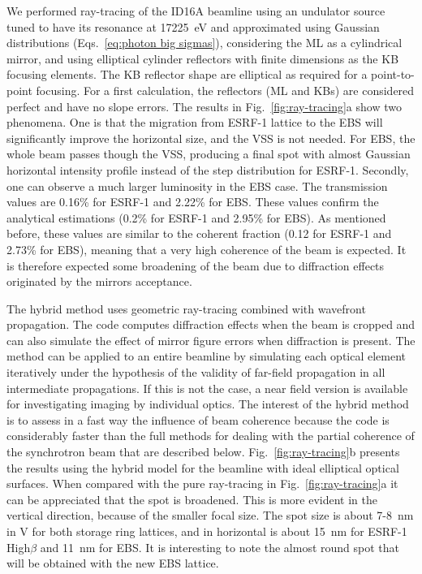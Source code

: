 \documentclass{iucr}              %
\begin{document}
We performed ray-tracing of the ID16A beamline using an undulator source tuned to have its resonance at 17225~eV and approximated using Gaussian distributions (Eqs.~\ref{eq:photon big sigmas}), considering the ML as a cylindrical mirror, and using elliptical cylinder reflectors with finite dimensions as the KB focusing elements. The KB reflector shape are elliptical as required for a point-to-point focusing. For a first calculation, the reflectors (ML and KBs) are considered perfect and have no slope errors. 
The results in Fig.~\ref{fig:ray-tracing}a show two phenomena. One is that the migration from ESRF-1 lattice to the EBS will significantly improve the horizontal size, and the VSS is not needed. For EBS, the whole beam passes though the VSS, producing a final spot with almost Gaussian horizontal intensity profile instead of the step distribution for ESRF-1. Secondly, one can observe a much larger luminosity in the EBS case. The transmission values are 0.16\% for ESRF-1 and 2.22\% for EBS. These values confirm the analytical estimations (0.2\% for ESRF-1 and 2.95\% for EBS). As mentioned before, these values are similar to the coherent fraction \cite{arxivCF} (0.12 for ESRF-1 and 2.73\% for EBS), meaning that a very high coherence of the beam is expected. It is therefore expected some broadening of the beam due to diffraction effects originated by the mirrors acceptance. 

The hybrid method \cite{hybrid} uses geometric ray-tracing combined with wavefront propagation. The code computes diffraction effects when the beam is cropped and can also simulate the effect of mirror figure errors when diffraction is present. The method can be applied to an entire beamline by simulating each optical element iteratively under the hypothesis of the validity of far-field propagation in all intermediate propagations. If this is not the case, a near field version is available for investigating imaging by individual optics. The interest of the hybrid method is to assess in a fast way the influence of beam coherence because the code is considerably faster than the full methods for dealing with the partial coherence of the synchrotron beam that are described below. Fig.~\ref{fig:ray-tracing}b presents the results using the hybrid model for the beamline with ideal elliptical optical surfaces. When compared with the pure ray-tracing in Fig.~\ref{fig:ray-tracing}a it can be appreciated that the spot is broadened. This is more evident in the vertical direction, because of the smaller focal size. The spot size is about 7-8~nm in V for both storage ring lattices, and in horizontal is about 15~nm for ESRF-1 High$\beta$ and 11~nm for EBS. It is interesting to note the almost round spot that will be obtained with the new EBS lattice. 
\end{document}
